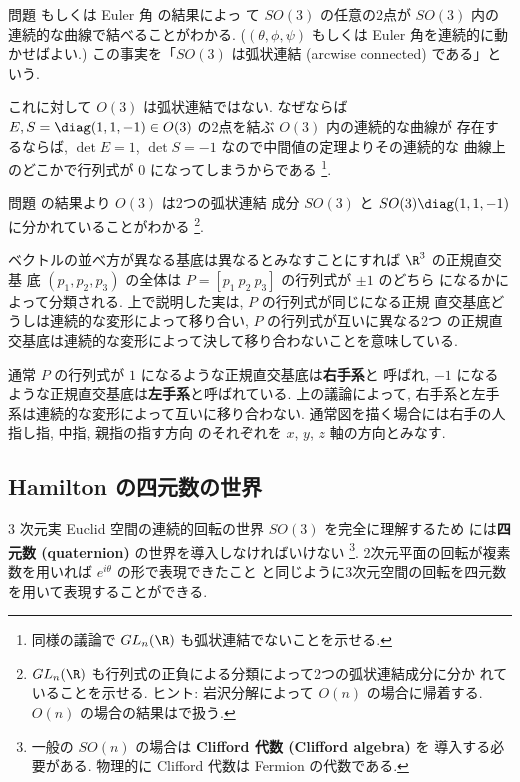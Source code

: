\documentclass[12pt,twoside]{jarticle}
\begin{document}
\bigskip

問題  もしくは Euler 角  の結果によっ
て $SO(3)$ の任意の2点が $SO(3)$ 内の連続的な曲線で結べることがわかる.
($(\theta,\phi,\psi)$ もしくは Euler 角を連続的に動かせばよい.) 
この事実を「$SO(3)$ は弧状連結 (arcwise connected) である」という.

これに対して $O(3)$ は弧状連結ではない. 
なぜならば $E,S=\diag(1,1,-1)\in O(3)$ の2点を結ぶ $O(3)$ 内の連続的な曲線が
存在するならば, $\det E=1$, $\det S=-1$ なので中間値の定理よりその連続的な
曲線上のどこかで行列式が $0$ になってしまうからである%
\footnote{同様の議論で $GL_n(\R)$ も弧状連結でないことを示せる.}.

問題  の結果より $O(3)$ は2つの弧状連結
成分 $SO(3)$ と $SO(3)\diag(1,1,-1)$ に分かれていることがわかる%
\footnote{$GL_n(\R)$ も行列式の正負による分類によって2つの弧状連結成分に分か
  れていることを示せる.  ヒント: 岩沢分解によって $O(n)$ の場合に帰着する.
  $O(n)$ の場合の結果はで扱う.}.

ベクトルの並べ方が異なる基底は異なるとみなすことにすれば $\R^3$ の正規直交基
底 $(p_1,p_2,p_3)$ の全体は $P=[p_1\ p_2\ p_3]$ の行列式が $\pm 1$ のどちら
になるかによって分類される.  上で説明した実は, $P$ の行列式が同じになる正規
直交基底どうしは連続的な変形によって移り合い, $P$ の行列式が互いに異なる2つ
の正規直交基底は連続的な変形によって決して移り合わないことを意味している.

通常 $P$ の行列式が $1$ になるような正規直交基底は{\bf 右手系}と
呼ばれ, $-1$ になるような正規直交基底は{\bf 左手系}と呼ばれている.
上の議論によって, 右手系と左手系は連続的な変形によって互いに移り合わない.
通常図を描く場合には右手の人指し指, 中指, 親指の指す方向
のそれぞれを $x$, $y$, $z$ 軸の方向とみなす.


\subsection{Hamilton の四元数の世界}
\label{sec:quaternion}

$3$ 次元実 Euclid 空間の連続的回転の世界 $SO(3)$ を完全に理解するため
には{\bf 四元数 (quaternion)} の世界を導入しなければいけない%
\footnote{一般の $SO(n)$ の場合は {\bf Clifford 代数 (Clifford algebra)} を
  導入する必要がある.  物理的に Clifford 代数は Fermion の代数である.}.
2次元平面の回転が複素数を用いれば $e^{i\theta}$ の形で表現できたこと
と同じように3次元空間の回転を四元数を用いて表現することができる.
\end{document}
